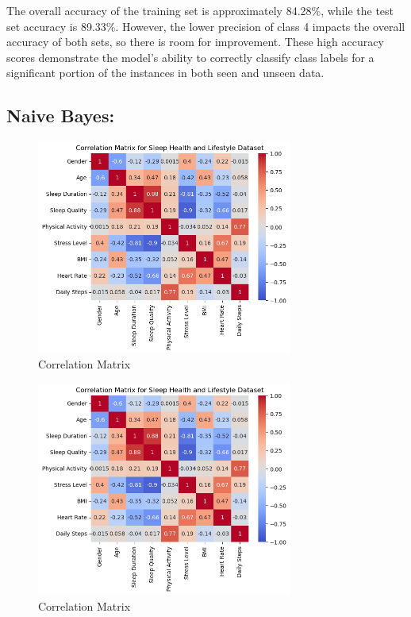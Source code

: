 \documentclass[11pt, letterpaper]{article}
\begin{document}
    \noindent The overall accuracy of the training set is approximately 84.28\%, while the test set accuracy is 89.33\%. However, the lower precision of class 4 impacts the overall accuracy of both sets, so there is room for improvement. These high accuracy scores demonstrate the model’s ability to correctly classify class labels for a significant portion of the instances in both seen and unseen data. 
    
    \noindent\subsection*{Naive Bayes:}

    \begin{figure}[H]
        \centering
        \includegraphics[width=0.75\textwidth]{correlation.png}
        \caption{Correlation Matrix}
        \label{fig:correlation}
    \end{figure}

    \begin{figure}[H]
        \centering
        \includegraphics[width=0.75\textwidth]{correlation.png}
        \caption{Correlation Matrix}
        \label{fig:correlation}
    \end{figure}
\end{document}
